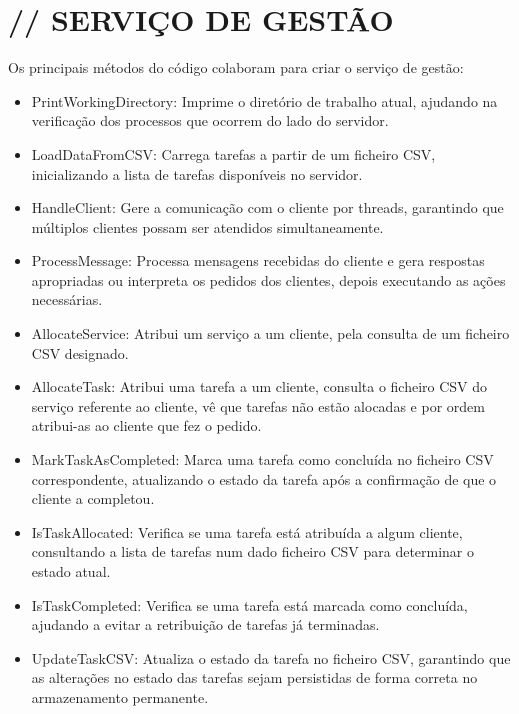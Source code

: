 \documentclass[12pt]{article}
\begin{document}
\section{// SERVIÇO DE GESTÃO}
Os principais métodos do código colaboram para criar o serviço de gestão:
\begin{itemize}
\item PrintWorkingDirectory: Imprime o diretório de trabalho atual, ajudando na verificação dos processos que ocorrem do lado do servidor.

\item LoadDataFromCSV: Carrega tarefas a partir de um ficheiro CSV, inicializando a lista de tarefas disponíveis no servidor.

\item HandleClient: Gere a comunicação com o cliente por threads, garantindo que múltiplos clientes possam ser atendidos simultaneamente.

\item ProcessMessage: Processa mensagens recebidas do cliente e gera respostas apropriadas ou interpreta os pedidos dos clientes, depois executando as ações necessárias.

\item AllocateService: Atribui um serviço a um cliente, pela consulta de um ficheiro CSV designado.

\item AllocateTask: Atribui uma tarefa a um cliente, consulta o ficheiro CSV do serviço referente ao cliente, vê que tarefas não estão alocadas e por ordem atribui-as ao cliente que fez o pedido.

\item MarkTaskAsCompleted: Marca uma tarefa como concluída no ficheiro CSV correspondente, atualizando o estado da tarefa após a confirmação de que o cliente a completou.

\item IsTaskAllocated: Verifica se uma tarefa está atribuída a algum cliente, consultando a lista de tarefas num dado ficheiro CSV para determinar o estado atual.

\item IsTaskCompleted: Verifica se uma tarefa está marcada como concluída, ajudando a evitar a retribuição de tarefas já terminadas.

\item UpdateTaskCSV: Atualiza o estado da tarefa no ficheiro CSV, garantindo que as alterações no estado das tarefas sejam persistidas de forma correta no armazenamento permanente.
\end{itemize}\newpage
\end{document}
